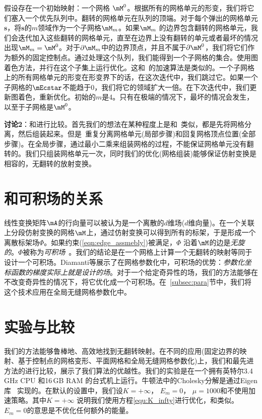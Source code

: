 假设存在一个初始映射：一个网格 $\mM^0$。根据所有的网格单元的形变，我们将它们塞入一个优先队列中。翻转的网格单元在队列的顶端。对于每个弹出的网格单元$\mathbf{s}$，将$\mathbf{s}$的$m$领域作为一个子网格$\mM_m$。如果$\mM_m$ 的边界包含翻转的网格单元，我们会迭代加入这些翻转的网格单元，直至在边界上没有翻转的单元或者最坏的情况出现$\mM_m = \mM^0$。对于$\partial \mM_m$中的边界顶点，并且不属于$\partial \mM^0$，我们将它们作为额外的固定控制点。通过处理这个队列，我们能得到一个子网格的集合。使用图着色方法，并行在这个子集上运行优化。这和~\cite{Fu2015}的加速算法是类似的。一个子网格上的所有网格单元的形变在形变界下的话，在这次迭代中，我们跳过它。如果一个子网格的$\mEcstar$不能趋于0，我们将它的领域扩大一倍。在下次迭代中，我们更新图着色，重新优化。初始的$m$是4。只有在极端的情况下，最坏的情况会发生，以至于子网格是$\mM^0$。

\textbf{讨论2}：和\cite{Liu2008}进行比较。首先我们的想法在某种程度上是和~\cite{Liu2008}类似，都是先将网格分离，然后组装起来。但是~\cite{Liu2008}重复分离网格单元(局部步骤)和回复网格顶点位置(全部步骤)。在全局步骤，通过最小二乘来组装网格的过程，不能保证网格单元没有翻转的。我们只组装网格单元一次，同时我们的优化(网格组装)能够保证仿射变换是相容的，无翻转的放射变换。

\section{和可积场的关系} \label{sec:field}
线性变换矩阵$\mA$的行向量可以被认为是一个离散的$d$维场($d$维向量)。在一个关联上分段仿射变换的网格$\mM$上，通过仿射变换可以得到所有的标架，于是形成一个离散标架场$\Phi$。如果约束(\ref{eqn:edge_assmebly})被满足，$\Phi$ 沿着$\mM$的边是\emph{无旋的}。$\Phi$被称为\emph{可积场}~\cite{Diamanti2015}。我们的结论是在一个网格上计算一个无翻转的映射等同于设计一个可积场。Diamanti等展示了在网格参数化中，可积场的优势：\emph{参数化坐标函数的梯度实际上就是设计的场}。对于一个给定奇异性的场，我们的方法能够在不改变奇异性的情况下，将它优化成一个可积场。在~\ref{subsec:para}节中，我们将这个技术应用在全局无缝网格参数化中。

\section{实验与比较} \label{sec:affine_results}
我们的方法能够鲁棒地、高效地找到无翻转映射。在不同的应用(固定边界的映射、基于控制点的网格变形、平面网格和全局无缝网格参数化)上，我们和最先进方法的进行比较，展示了我们算法的优越性。我们的实验是在一个拥有英特尔3.4\,GHz CPU 和16\,GB RAM 的台式机上运行。牛顿法中的Cholesky分解是通过Eigen库~\cite{eigenweb} 实现的。在默认的设置中，我们设$K = +\infty$， $E_m = 0$， $\mu = 1000$和不使用加速策略。其中$K = +\infty$ 说明我们使用方程\ref{equ:K_infty}进行优化，和\cite{Fu2015}类似。$E_m = 0$的意思是不优化任何额外的能量。


